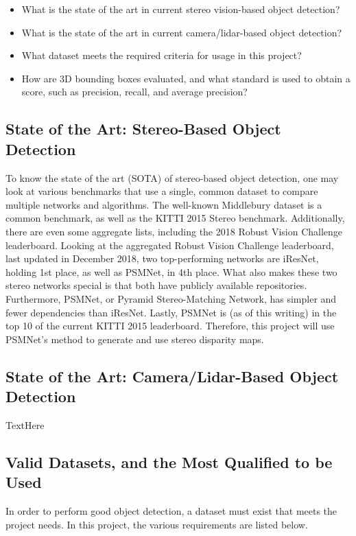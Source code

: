 \begin{itemize} \itemsep=-0.5em
\item What is the state of the art in current stereo vision-based object detection? %
\item What is the state of the art in current camera/lidar-based object detection?  %
\item What dataset meets the required criteria for usage in this project?			%
\item How are 3D bounding boxes evaluated, and what standard is used to obtain a score, such as precision, recall, and average precision?
\end{itemize}

\subsection{State of the Art: Stereo-Based Object Detection}
To know the state of the art (SOTA) of stereo-based object detection, one may look at various benchmarks that use a single, common dataset to compare multiple networks and algorithms. The well-known Middlebury \cite{scharstein2014high,middlebury_leaderboard} dataset is a common benchmark, as well as the KITTI \cite{geiger_are_2012,kitti_leaderboard} 2015 Stereo benchmark. Additionally, there are even some aggregate lists, including the 2018 Robust Vision Challenge \cite{rvc_leaderboard} leaderboard. Looking at the aggregated Robust Vision Challenge leaderboard, last updated in December 2018, two top-performing networks are iResNet, holding 1st place, as well as PSMNet, in 4th place. What also makes these two stereo networks special is that both have publicly available repositories. Furthermore, PSMNet, or Pyramid Stereo-Matching Network, has simpler and fewer dependencies than iResNet. Lastly, PSMNet is (as of this writing) in the top 10 of the current KITTI 2015 leaderboard. Therefore, this project will use PSMNet's method to generate and use stereo disparity maps. 

\subsection{State of the Art: Camera/Lidar-Based Object Detection}
TextHere

\subsection{Valid Datasets, and the Most Qualified to be Used}
In order to perform good object detection, a dataset must exist that meets the project needs. In this project, the various requirements are listed below. \\

